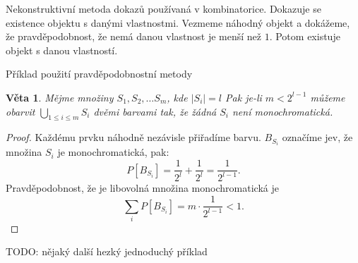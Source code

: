 \documentclass[a4paper,10pt,titlepage]{article} \usepackage[utf8]{inputenc}
\newtheorem{theorem}{Věta}
\begin{document}
Nekonstruktivní metoda dokazů používaná v kombinatorice.
Dokazuje se existence objektu s danými vlastnostmi.
Vezmeme náhodný objekt a dokážeme, že pravděpodobnost, že nemá danou vlastnost je menší než $1$.
Potom existuje objekt s danou vlastností.


Příklad použití pravděpodobnostní metody
\begin{theorem}
Mějme množiny $S_1, S_2, \ldots S_m$, kde $|S_i| = l$
Pak je-li $m < 2^{l-1}$ můžeme obarvit $\bigcup_{1\leq i \leq m} S_i$ dvěmi barvami tak, že žádná $S_i$ není monochromatická.
\end{theorem}

\begin{proof}
Každému prvku náhodně nezávisle přiřadíme barvu.
$B_{S_i}$ označíme jev, že množina $S_i$ je monochromatická, pak:
\[
	P[B_{S_i}] = \frac{1}{2^l} + \frac{1}{2^l} = \frac{1}{2^{l-1}}.
\]
Pravděpodobnost, že je libovolná množina monochromatická je 
\[
	\sum_i P[B_{S_i}] = m \cdot \frac{1}{2^{l-1}} < 1.
\]
\end{proof}

TODO: nějaký další hezký jednoduchý příklad
\end{document}

